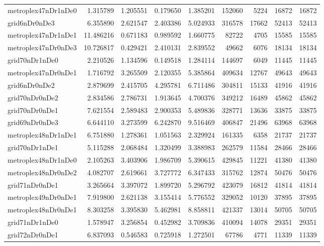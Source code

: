\begin{longtable}{|l|r|r|r|r|r|r|r|r|}
metroplex47nDr1nDe0 & 1.315789 & 1.205551 & 0.179650 & 1.385201 & 152060 & 5224 & 16872 & 16872 \\
grid6nDr0nDe3 & 6.355890 & 2.621547 & 2.403386 & 5.024933 & 316578 & 17662 & 52413 & 52413 \\
metroplex47nDr1nDe1 & 11.486216 & 0.671183 & 0.989592 & 1.660775 & 82722 & 4705 & 15585 & 15585 \\
metroplex47nDr0nDe3 & 10.726817 & 0.429421 & 2.410131 & 2.839552 & 49662 & 6076 & 18134 & 18134 \\
grid70nDr1nDe0 & 2.210526 & 1.134596 & 0.149518 & 1.284114 & 144697 & 6049 & 11445 & 11445 \\
metroplex47nDr0nDe1 & 1.716792 & 3.265509 & 2.120355 & 5.385864 & 409634 & 12767 & 49643 & 49643 \\
grid6nDr0nDe2 & 2.879699 & 2.415705 & 4.295781 & 6.711486 & 304811 & 15133 & 41916 & 41916 \\
grid70nDr0nDe2 & 2.834586 & 2.786731 & 1.913645 & 4.700376 & 349212 & 16489 & 45862 & 45862 \\
grid70nDr0nDe1 & 7.621554 & 2.589483 & 2.900353 & 5.489836 & 328771 & 13636 & 33875 & 33875 \\
grid69nDr0nDe3 & 6.644110 & 3.273599 & 6.242870 & 9.516469 & 406847 & 21496 & 63968 & 63968 \\
metroplex48nDr1nDe1 & 6.751880 & 1.278361 & 1.051563 & 2.329924 & 161335 & 6358 & 21737 & 21737 \\
grid70nDr1nDe1 & 5.115288 & 2.068484 & 1.320499 & 3.388983 & 262579 & 11584 & 28466 & 28466 \\
metroplex48nDr1nDe0 & 2.105263 & 3.403906 & 1.986709 & 5.390615 & 429845 & 11221 & 41380 & 41380 \\
metroplex48nDr0nDe2 & 4.082707 & 2.619661 & 3.727772 & 6.347433 & 315762 & 12874 & 50476 & 50476 \\
grid71nDr0nDe1 & 3.265664 & 3.397072 & 1.899720 & 5.296792 & 423079 & 16812 & 41814 & 41814 \\
metroplex49nDr0nDe1 & 7.919800 & 2.621138 & 3.155414 & 5.776552 & 329052 & 10120 & 37895 & 37895 \\
metroplex48nDr0nDe1 & 8.303258 & 3.395830 & 5.462981 & 8.858811 & 421337 & 13014 & 50705 & 50705 \\
grid71nDr1nDe0 & 1.578947 & 3.256854 & 0.452982 & 3.709836 & 410094 & 14078 & 29351 & 29351 \\
grid72nDr0nDe1 & 6.837093 & 0.546583 & 0.725918 & 1.272501 & 67786 & 4771 & 11339 & 11339 \\

\end{longtable}
